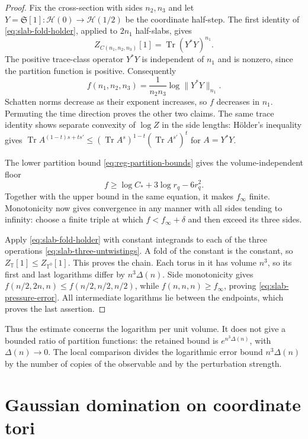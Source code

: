 \begin{proof}
Fix the cross-section with sides $n_2,n_3$ and let
$Y=\mathfrak S[1]:\mathcal H(0)\to\mathcal H(1/2)$ be the coordinate
half-step. The first identity of \eqref{eq:slab-fold-holder}, applied
to $2n_1$ half-slabs, gives
\begin{equation}\label{eq:slab-pressure-trace}
 Z_{C(n_1,n_2,n_3)}[1]=\operatorname{Tr}(Y^*Y)^{n_1}.
\end{equation}
The positive trace-class operator $Y^*Y$ is independent of $n_1$ and
is nonzero, since the partition function is positive. Consequently
\[
 f(n_1,n_2,n_3)=\frac1{n_2n_3}\log\|Y^*Y\|_{n_1}.
\]
Schatten norms decrease as their exponent increases, so $f$ decreases
in $n_1$. Permuting the time direction proves the other two claims.
The same trace identity shows separate convexity of $\log Z$ in the
side lengths: H\"older's inequality gives
$\operatorname{Tr}A^{(1-t)s+ts'}\le
 (\operatorname{Tr}A^s)^{1-t}(\operatorname{Tr}A^{s'})^t$ for $A=Y^*Y$.

The lower partition bound \eqref{eq:reg-partition-bounds} gives the
volume-independent floor
\[
 f\ge\log C_*+3\log r_q-6r_q^2.
\]
Together with the upper bound in the same equation, it makes
$f_\infty$ finite. Monotonicity now gives convergence in any manner
with all sides tending to infinity: choose a finite triple at which
$f<f_\infty+\delta$ and then exceed its three sides.

Apply \eqref{eq:slab-fold-holder} with constant integrands to each of
the three operations \eqref{eq:slab-three-untwistings}. A fold of
the constant is the constant, so $Z_{\mathbb T}[1]\le Z_{\mathbb T^0}[1]$.
This proves the chain. Each torus in it has volume $n^3$, so its first
and last logarithms differ by $n^3\Delta(n)$. Side monotonicity gives
$f(n/2,2n,n)\le f(n/2,n/2,n/2)$, while
$f(n,n,n)\ge f_\infty$, proving \eqref{eq:slab-pressure-error}.
All intermediate logarithms lie between the endpoints, which proves
the last assertion.
\end{proof}

Thus the estimate concerns the logarithm per unit volume. It does not
give a bounded ratio of partition functions: the retained bound is
$e^{n^3\Delta(n)}$, with $\Delta(n)\to0$. The local comparison
divides the logarithmic error bound $n^3\Delta(n)$ by the number of
copies of the observable and by the perturbation strength.

\section{Gaussian domination on coordinate tori}\label{sec:coordinate}


